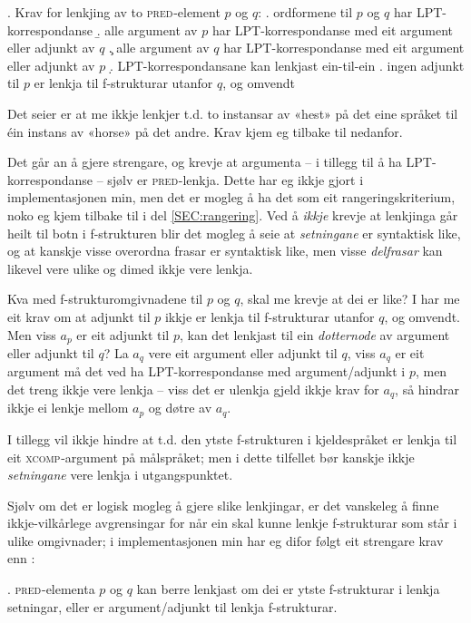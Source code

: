 \documentclass[11pt,a4paper,oneside,draft]{book}
\newcommand{\F}[2]{\textsc{#1}\ensuremath{_{#2}}}
\newcommand{\XCOMP}{\F{xcomp}{}}
\newcommand{\PRED}{\F{pred}{}}
\begin{document}
\ex. \label{krav:PRED} Krav for lenkjing av to \PRED{}-element $p$ og $q$:
\a. ordformene til $p$ og $q$ har LPT-korrespondanse
\b. alle argument av $p$ har LPT-korrespondanse med eit argument eller adjunkt av $q$
\c. alle argument av $q$ har LPT-korrespondanse med eit argument eller adjunkt av $p$
\d. LPT-korrespondansane kan lenkjast ein-til-ein
\e. ingen adjunkt til $p$ er lenkja til f-strukturar utanfor $q$, og omvendt

Det \Last[d] seier er at me ikkje lenkjer t.d. to instansar av «hest»
på det eine språket til éin instans av «horse» på det andre. Krav
\Last[e] kjem eg tilbake til nedanfor.

Det går an å gjere \Last strengare, og krevje at argumenta -- i
tillegg til å ha LPT-korrespondanse -- sjølv er \PRED{}-lenkja. Dette har
eg ikkje gjort i implementasjonen min, men det er mogleg å ha det som
eit rangeringskriterium, noko eg kjem tilbake til i del
\ref{SEC:rangering}. Ved å \emph{ikkje} krevje at lenkjinga går heilt til
botn i f-strukturen blir det mogleg å seie at \emph{setningane} er
syntaktisk like, og at kanskje visse overordna frasar er syntaktisk
like, men visse \emph{delfrasar} kan likevel vere ulike og dimed ikkje vere
lenkja.

Kva med f-strukturomgivnadene til $p$ og $q$, skal me krevje at dei er
like?  I \Last[e] har me eit krav om at adjunkt til $p$ ikkje er
lenkja til f-strukturar utanfor $q$, og omvendt. Men viss $a_p$ er eit
adjunkt til $p$, kan det lenkjast til ein \emph{dotternode} av argument
eller adjunkt til $q$? La $a_q$ vere eit argument eller adjunkt til
$q$, viss $a_q$ er eit argument må det ved \Last ha LPT-korrespondanse
med argument/adjunkt i $p$, men det treng ikkje vere lenkja -- viss
det er ulenkja gjeld ikkje krav \Last for $a_q$, så \Last hindrar
ikkje ei lenkje mellom $a_p$ og døtre av $a_q$. 

I tillegg vil ikkje \Last hindre at t.d. den ytste f-strukturen i
kjeldespråket er lenkja til eit \XCOMP{}-argument på målspråket; men i
dette tilfellet bør kanskje ikkje \emph{setningane} vere lenkja i
utgangspunktet.

Sjølv om det er logisk mogleg å gjere slike lenkjingar, er det
vanskeleg å finne ikkje-vilkårlege avgrensingar for når ein skal kunne
lenkje f-strukturar som står i ulike omgivnader; i implementasjonen
min har eg difor følgt eit strengare krav enn \Last[e]:

\ex. \label{krav:PRED-omgivnad} \PRED{}-elementa $p$ og $q$ kan berre
     lenkjast om dei er ytste f-strukturar i lenkja setningar, eller
     er argument/adjunkt til lenkja f-strukturar.
\end{document}
